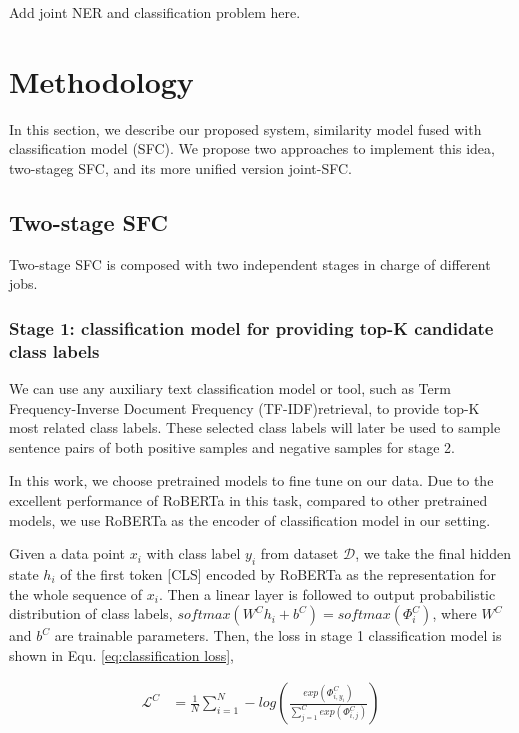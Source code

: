 \documentclass[letterpaper]{article} %
\begin{document}
  {Add joint NER and classification problem here.}

  \section{Methodology}
  In  this section, we describe our proposed system, similarity model fused with
  classification  model (SFC). We propose two approaches to implement this idea,
  two-stageg SFC, and its more unified version joint-SFC.

  \subsection{Two-stage SFC}

  Two-stage   SFC  is  composed  with  two  independent stages  in  charge of
  different  jobs. 

  \subsubsection*{
    Stage 1: classification model for providing top-K candidate class labels
  } 
  We  can  use any auxiliary text classification model or tool,
  such as Term Frequency-Inverse Document Frequency (TF-IDF)retrieval, to
  provide  top-K  most  related  class  labels. These selected class labels will
  later  be  used to sample sentence pairs of both positive samples and negative
  samples  for  stage  2. 

  In  this  work,  we  choose pretrained models to fine tune on our data.
  Due to the excellent performance of RoBERTa in this task, compared to other pretrained
  models, we use RoBERTa as the encoder of classification model in our setting.

  Given   a   data   point   $x_{i}$  with  class  label  $y_{i}$  from  dataset
  $\mathcal{D}$, we take the final hidden state $h_{i}$ of the first token [CLS]
  encoded  by  RoBERTa  as the representation for the whole sequence of $x_{i}$.
  Then  a linear layer is followed to output probabilistic distribution of class
  labels,  $softmax(W^Ch_{i}+b^C)=softmax({\Phi}^C_{i})$,  where $W^C$ and $b^C$
  are  trainable  parameters.  Then, the loss in stage 1 classification model is
  shown in Equ. \ref{eq:classification loss},

  \begin{equation}
    \begin{aligned}
      \mathcal{L}^{C}&=\frac{1}{N}\sum_{i=1}^{N}-log(\frac{exp(\varPhi_{i,y_{i}}^C)}{\sum_{j=1}^{C}exp(\varPhi_{i,j}^C)}) \\
      \label{eq:classification loss}
    \end{aligned}
  \end{equation}
\end{document}
